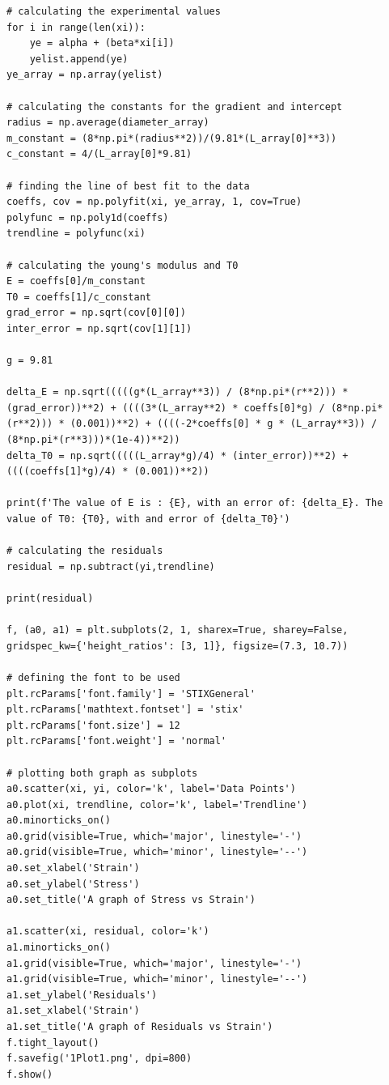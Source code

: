 \documentclass[12pt, a4paper]{article}
\begin{document}
\begin{verbatim}
# calculating the experimental values 
for i in range(len(xi)):
    ye = alpha + (beta*xi[i])
    yelist.append(ye)
ye_array = np.array(yelist)

# calculating the constants for the gradient and intercept
radius = np.average(diameter_array)
m_constant = (8*np.pi*(radius**2))/(9.81*(L_array[0]**3))
c_constant = 4/(L_array[0]*9.81)

# finding the line of best fit to the data
coeffs, cov = np.polyfit(xi, ye_array, 1, cov=True)
polyfunc = np.poly1d(coeffs)
trendline = polyfunc(xi)

# calculating the young's modulus and T0
E = coeffs[0]/m_constant
T0 = coeffs[1]/c_constant
grad_error = np.sqrt(cov[0][0])
inter_error = np.sqrt(cov[1][1])

g = 9.81

delta_E = np.sqrt(((((g*(L_array**3)) / (8*np.pi*(r**2))) * (grad_error))**2) + ((((3*(L_array**2) * coeffs[0]*g) / (8*np.pi*(r**2))) * (0.001))**2) + ((((-2*coeffs[0] * g * (L_array**3)) / (8*np.pi*(r**3)))*(1e-4))**2))
delta_T0 = np.sqrt(((((L_array*g)/4) * (inter_error))**2) + ((((coeffs[1]*g)/4) * (0.001))**2))

print(f'The value of E is : {E}, with an error of: {delta_E}. The value of T0: {T0}, with and error of {delta_T0}')

# calculating the residuals
residual = np.subtract(yi,trendline)

print(residual)

f, (a0, a1) = plt.subplots(2, 1, sharex=True, sharey=False, gridspec_kw={'height_ratios': [3, 1]}, figsize=(7.3, 10.7))

# defining the font to be used
plt.rcParams['font.family'] = 'STIXGeneral'
plt.rcParams['mathtext.fontset'] = 'stix'
plt.rcParams['font.size'] = 12
plt.rcParams['font.weight'] = 'normal'

# plotting both graph as subplots
a0.scatter(xi, yi, color='k', label='Data Points')
a0.plot(xi, trendline, color='k', label='Trendline')
a0.minorticks_on()
a0.grid(visible=True, which='major', linestyle='-')
a0.grid(visible=True, which='minor', linestyle='--')
a0.set_xlabel('Strain')
a0.set_ylabel('Stress')
a0.set_title('A graph of Stress vs Strain')

a1.scatter(xi, residual, color='k')
a1.minorticks_on()
a1.grid(visible=True, which='major', linestyle='-')
a1.grid(visible=True, which='minor', linestyle='--')
a1.set_ylabel('Residuals')
a1.set_xlabel('Strain')
a1.set_title('A graph of Residuals vs Strain')
f.tight_layout()
f.savefig('1Plot1.png', dpi=800)
f.show()

\end{verbatim}
\newpage
\end{document}

